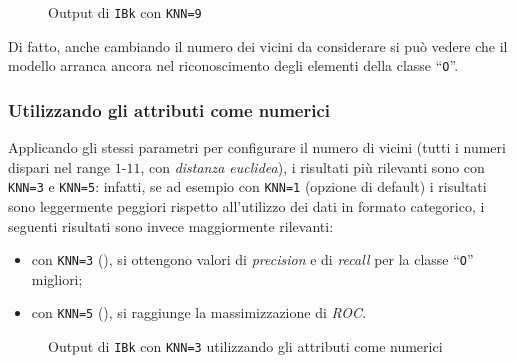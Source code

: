 
\begin{figure}[H]
  \centering
  \caption{Output di \texttt{IBk} con \texttt{KNN=9}}%
  \label{fig:ibk:9}
\end{figure}

Di fatto, anche cambiando il numero dei vicini da considerare si può vedere che il modello arranca ancora nel riconoscimento degli elementi della classe ``\texttt{O}''.

\subsubsection{Utilizzando gli attributi come numerici}\label{subsub:ibk:numeric}

Applicando gli stessi parametri per configurare il numero di vicini (tutti i numeri dispari nel range \(1\)-\(11\), con \emph{distanza euclidea}), i risultati più rilevanti sono con \texttt{KNN=3} e \texttt{KNN=5}:
infatti, se ad esempio con \texttt{KNN=1} (opzione di default) i risultati sono leggermente peggiori rispetto all'utilizzo dei dati in formato categorico, i seguenti risultati sono invece maggiormente rilevanti:

\begin{itemize}
  \item con \texttt{KNN=3} (), si ottengono valori di \emph{precision} e di \emph{recall} per la classe ``\texttt{O}'' migliori;
  \item con \texttt{KNN=5} (), si raggiunge la massimizzazione di \emph{ROC}.
\end{itemize}


\begin{figure}[H]
  \centering
  \caption{Output di \texttt{IBk} con \texttt{KNN=3} utilizzando gli attributi come numerici}%
  \label{fig:ibk:3-num}
\end{figure}

